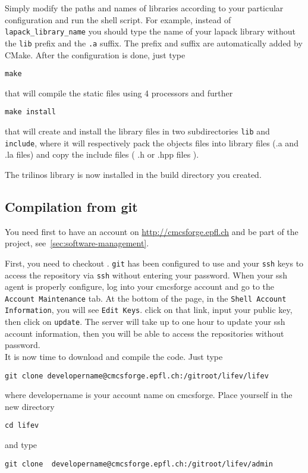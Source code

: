 Simply modify the paths and names of libraries according to your particular configuration and run the shell script.
For example, instead of \verb!lapack_library_name! you should type the name of your lapack library without the 
\verb!lib! prefix and the \verb!.a! suffix. The prefix and suffix are automatically added by CMake. 
After the configuration is done, just type
\begin{verbatim}
make 
\end{verbatim}
that  will compile the static files using 4 processors and further 
\begin{verbatim}
make install
\end{verbatim}
that will create and install the library files
in two subdirectories \verb|lib| and \verb|include|, where
it will respectively pack the objects files into library files (.a and .la files)
and copy the include files ( .h or .hpp files ).

The trilinos library is now installed in the build directory you created.

\subsection{Compilation from git}
\label{sec:compile-cvs}
You need first to have an account on \url{http://cmcsforge.epfl.ch} and
be part of the \lifev project, see~\ref{sec:software-management}.

\noindent First, you need to checkout \lifev. \verb!git! has
been configured to use  and your \verb!ssh! keys to
access the repository via \verb!ssh! without entering your password.
When your ssh agent is properly configure, log into your cmcsforge account and
go to the \verb!Account Maintenance! tab. At the bottom of the page, in the
\verb!Shell Account Information!, you will see \verb!Edit Keys!. click on that link,
input your public key, then click on \verb!update!. The server will take up to one
hour to update your ssh account information, then you will be able to access the
repositories without password.\\

It is now time to download and compile the code. 
Just type
\begin{verbatim}
git clone developername@cmcsforge.epfl.ch:/gitroot/lifev/lifev
\end{verbatim}
where developername is your account name on cmcsforge. Place yourself in the new directory

\begin{verbatim}
cd lifev
\end{verbatim}
and type
\begin{verbatim}
git clone  developername@cmcsforge.epfl.ch:/gitroot/lifev/admin
\end{verbatim}


